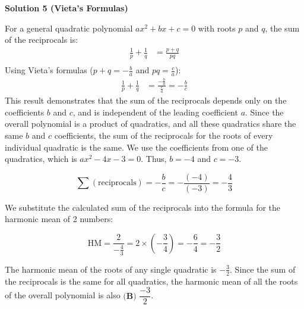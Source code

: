 \begin{enumerate}
 



\textbf{Solution 5 (Vieta's Formulas)}

For a general quadratic polynomial $ax^2 + bx + c = 0$ with roots $p$ and $q$, the sum of the reciprocals is:\begin{align*}\frac{1}{p} + \frac{1}{q} &= \frac{p+q}{pq} \\\end{align*}
Using Vieta's formulas ($p+q = -\frac{b}{a}$ and $pq = \frac{c}{a}$):\begin{align*}\frac{1}{p} + \frac{1}{q} &= \frac{-\frac{b}{a}}{\frac{c}{a}} = -\frac{b}{c}\end{align*}
This result demonstrates that the sum of the reciprocals depends only on the coefficients $b$ and $c$, and is independent of the leading coefficient $a$. Since the overall polynomial is a product of quadratics, and all these quadratics share the same $b$ and $c$ coefficients, the sum of the reciprocals for the roots of every individual quadratic is the same. We use the coefficients from one of the quadratics, which is $ax^2 - 4x - 3 = 0$. Thus, $b=-4$ and $c=-3$.

 
 \[\sum (\text{reciprocals}) = -\frac{b}{c} = -\frac{(-4)}{(-3)} = -\frac{4}{3}\]

 We substitute the calculated sum of the reciprocals into the formula for the harmonic mean of 2 numbers:

 
 \[\text{HM} = \frac{2}{-\frac{4}{3}} = 2 \times \left(-\frac{3}{4}\right) = -\frac{6}{4} = -\frac{3}{2}\]

 The harmonic mean of the roots of any single quadratic is $-\frac{3}{2}$. Since the sum of the reciprocals is the same for all quadratics, the harmonic mean of all the roots of the overall polynomial is also $\boxed{\textbf{(B) }\dfrac{-3}{2}}$.


\end{enumerate}
